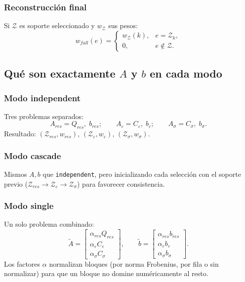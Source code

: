 \documentclass[11pt,a4paper]{article}
\begin{document}
\subsubsection*{Reconstrucción final}
Si $\mathcal Z$ es soporte seleccionado y $w_{\mathcal Z}$ sus pesos:
\[
w_{full}(e)=
\begin{cases}
w_{\mathcal Z}(k), & e=\mathcal Z_k,\\
0, & e\notin\mathcal Z.
\end{cases}
\]

\subsection{Qué son exactamente $A$ y $b$ en cada modo}
\subsubsection*{Modo independent}
Tres problemas separados:
\[
A_{res}=Q_{res},\; b_{res};
\qquad
A_{\varepsilon}=C_{\varepsilon},\; b_{\varepsilon};
\qquad
A_{\sigma}=C_{\sigma},\; b_{\sigma}.
\]
Resultado: $(\mathcal Z_{res},w_{res})$, $(\mathcal Z_{\varepsilon},w_{\varepsilon})$,
$(\mathcal Z_{\sigma},w_{\sigma})$.

\subsubsection*{Modo cascade}
Mismos $A,b$ que \texttt{independent}, pero inicializando cada selección con el soporte previo
($\mathcal Z_{res}\to\mathcal Z_{\varepsilon}\to\mathcal Z_{\sigma}$) para favorecer consistencia.

\subsubsection*{Modo single}
Un solo problema combinado:
\[
\widetilde{A}=
\begin{bmatrix}
\alpha_{res}Q_{res}\\
\alpha_{\varepsilon}C_{\varepsilon}\\
\alpha_{\sigma}C_{\sigma}
\end{bmatrix},
\qquad
\widetilde{b}=
\begin{bmatrix}
\alpha_{res}b_{res}\\
\alpha_{\varepsilon}b_{\varepsilon}\\
\alpha_{\sigma}b_{\sigma}
\end{bmatrix}.
\]
Los factores $\alpha$ normalizan bloques (por norma Frobenius, por fila o sin normalizar)
para que un bloque no domine numéricamente al resto.
\end{document}
